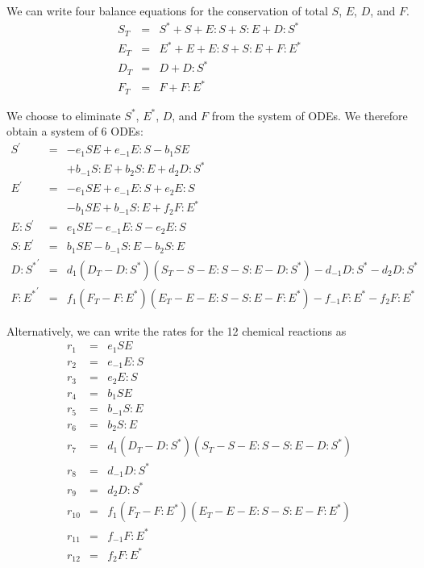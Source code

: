 \documentclass[aip,jcp,preprint]{revtex4-1}
\begin{document}
We can write four balance equations for the conservation of total $S$, $E$, $D$, and $F$.
\begin{equation}
    \begin{array}{rcl}
        S_T & = & S^{*} + S + E:S + S:E + D:S^{*} \\
        E_T & = & E^{*} + E + E:S + S:E + F:E^{*} \\
        D_T & = & D + D:S^{*} \\
        F_T & = & F + F:E^{*}
    \end{array}
\end{equation}

\begin{widetext}
We choose to eliminate $S^{*}$, $E^{*}$, $D$, and $F$ from the system of ODEs.
%
We therefore obtain a system of 6 ODEs:
\begin{equation}
    \begin{array}{rcl}
        S^\prime & = & -e_1 S E + e_{-1} E:S -b_1 S E \\
                        &   & + b_{-1} S:E + b_2 S:E + d_2 D:S^{*} \\
        E^\prime & = & -e_1 S E + e_{-1} E:S + e_2 E:S \\
                        &   & - b_1 S E +b_{-1} S:E + f_2 F:E^{*} \\
        E:S^\prime  & = & e_1 S E -e_{-1} E:S -e_2 E:S \\
        S:E^\prime & = & b_1 S E -b_{-1} S:E -b_2 S:E \\
        {D:S^{*}}^\prime & = & d_1 (D_T - D:S^{*}) (S_T - S - E:S - S:E - D:S^{*}) - d_{-1} D:S^{*} -d_2 D:S^{*} \\
        {F:E^{*}}^\prime & = & f_1 (F_T - F:E^{*}) (E_T - E - E:S - S:E - F:E^{*}) - f_{-1} F:E^{*} -f_2 F:E^{*}
    \end{array}
\end{equation}
\end{widetext}

Alternatively, we can write the rates for the 12 chemical reactions as
\begin{equation}
    \begin{array}{rcl}
        r_1 & = & e_1 S E \\
        r_2 & = & e_{-1} E:S \\
        r_3 & = & e_2 E:S \\
        r_4 & = & b_1 S E \\
        r_5 & = & b_{-1} S:E \\
        r_6 & = & b_2 S:E \\
        r_7 & = & d_1 (D_T - D:S^{*}) (S_T - S - E:S - S:E - D:S^{*}) \\
        r_8 & = & d_{-1} D:S^{*} \\
        r_9 & = & d_2 D:S^{*} \\
        r_{10} & = & f_1 (F_T - F:E^{*}) (E_T - E - E:S - S:E - F:E^{*}) \\
        r_{11} & = & f_{-1} F:E^{*} \\
        r_{12} & = & f_2 F:E^{*}
    \end{array}
\end{equation}
\end{document}
